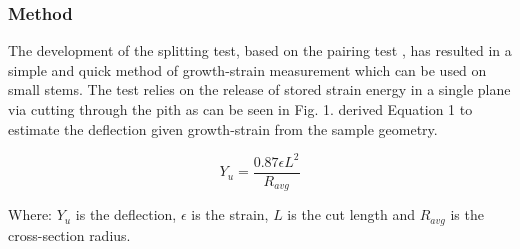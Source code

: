 \subsubsection*{Method}
The development of the splitting test, based on the pairing test \citep{Chauhan_2010}, has resulted in a simple and quick method of growth-strain measurement which can be used on small stems. The test relies on the release of stored strain energy in a single plane via cutting through the pith as can be seen in Fig. 1. \citet{Chauhan_2010} derived Equation 1 to estimate the deflection given growth-strain from the sample geometry.

\begin{equation}
Y_u = \frac{0.87 \epsilon L^2}{R_{avg}}
\end{equation}
  
 Where: \(Y_u\) is the deflection, \(\epsilon\) is the strain, \(L\) is the cut length and \(R_{avg}\) is the cross-section radius. 